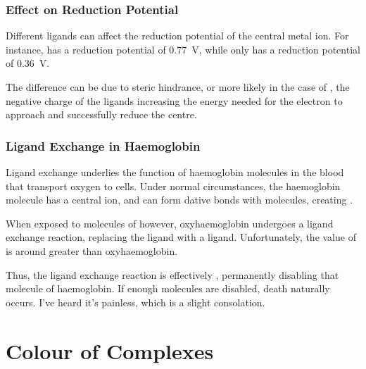 


			\subsubsection{Effect on Reduction Potential}

				Different ligands can affect the reduction potential of the central metal ion. For instance,  has a reduction
				potential of \SI[retain-explicit-plus]{+0.77}{\volt}, while  only has a reduction potential of
				\SI[retain-explicit-plus]{+0.36}{\volt}.

				The difference can be due to steric hindrance, or more likely in the case of , the negative charge of the
				ligands increasing the energy needed for the electron to approach and successfully reduce the  centre.



			\subsubsection{Ligand Exchange in Haemoglobin}

				Ligand exchange underlies the function of haemoglobin molecules in the blood that transport oxygen to cells. Under normal
				circumstances, the haemoglobin molecule has a central  ion, and can  form dative bonds with 
				molecules, creating .

				When exposed to molecules of  however, oxyhaemoglobin undergoes a ligand exchange reaction, replacing the  ligand
				with a  ligand. Unfortunately, the \Kstab{} value of  is around  greater
				than oxyhaemoglobin.

				Thus, the ligand exchange reaction is effectively , permanently disabling that molecule of haemoglobin.
				If enough molecules are disabled, death naturally occurs. I've heard it's painless, which is a slight consolation.




	\section{Colour of Complexes}

